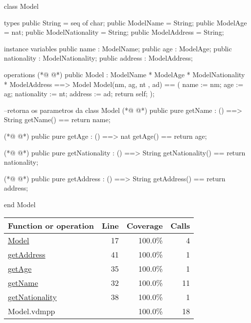 \begin{vdmpp}[breaklines=true]
class Model

types
 public String = seq of char;
 public ModelName = String;
 public ModelAge = nat;
 public ModelNationality = String;
 public ModelAddress = String;
 
instance variables
 public name : ModelName;
 public age : ModelAge;
 public nationality : ModelNationality;
 public address : ModelAddress;
 
 operations
(*@
\label{Model:17}
@*)
  public Model : 
          ModelName * 
          ModelAge *
          ModelNationality * 
          ModelAddress ==> Model
  Model(nm, ag, nt , ad) ==
  (
    name := nm;
    age := ag;
    nationality := nt;
    address := ad;
    return self;
  );
  
  --retorna os parametros da class Model
(*@
\label{getName:32}
@*)
  public pure getName : () ==> String
    getName() == return name;
    
(*@
\label{getAge:35}
@*)
   public pure getAge : () ==> nat
     getAge() == return age;
     
(*@
\label{getNationality:38}
@*)
  public pure getNationality : () ==> String
     getNationality() == return nationality;
     
(*@
\label{getAddress:41}
@*)
  public pure getAddress : () ==> String
     getAddress() == return address;      
     
     
end Model
\end{vdmpp}
\bigskip
\begin{longtable}{|l|r|r|r|}
\hline
Function or operation & Line & Coverage & Calls \\
\hline
\hline
\hyperref[Model:17]{Model} & 17&100.0\% & 4 \\
\hline
\hyperref[getAddress:41]{getAddress} & 41&100.0\% & 1 \\
\hline
\hyperref[getAge:35]{getAge} & 35&100.0\% & 1 \\
\hline
\hyperref[getName:32]{getName} & 32&100.0\% & 11 \\
\hline
\hyperref[getNationality:38]{getNationality} & 38&100.0\% & 1 \\
\hline
\hline
Model.vdmpp & & 100.0\% & 18 \\
\hline
\end{longtable}

